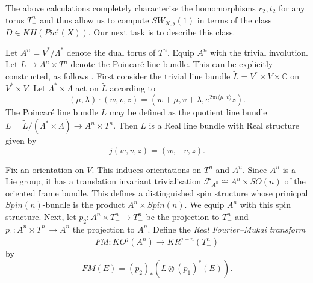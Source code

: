 \documentclass{amsart}
\theoremstyle{definition}
\theoremstyle{remark}
\numberwithin{equation}{section}
\begin{document}
The above calculations completely characterise the homomorphisms $r_2,t_2$ for any torus $T^n_-$ and thus allow us to compute $SW_{X,\mathfrak{s}}(1)$ in terms of the class $D \in KH( Pic^{\mathfrak{s}}(X) )$. Our next task is to describe this class.

Let $A^n = V^*/\Lambda^*$ denote the dual torus of $T^n$. Equip $A^n$ with the trivial involution. Let $L \to A^n \times T^n$ denote the Poincar\'e line bundle. This can be explicitly constructed, as follows \cite{fk}. First consider the trivial line bundle $\widetilde{L} = V^* \times V \times \mathbb{C}$ on $V^* \times V$. Let $\Lambda^* \times \Lambda$ act on $\widetilde{L}$ according to
\[
( \mu , \lambda ) \cdot ( w , v , z ) = (w + \mu , v + \lambda , e^{2\pi i \langle \mu , v \rangle } z).
\]
The Poincar\'e line bundle $L$ may be defined as the quotient line bundle $L = \widetilde{L}/(\Lambda^* \times \Lambda) \to A^n \times T^n$. Then $L$ is a Real line bundle with Real structure given by
\[
j( w , v , z ) = (w , -v , \overline{z}).
\]

Fix an orientation on $V$. This induces orientations on $T^n$ and $A^n$. Since $A^n$ is a Lie group, it has a translation invariant trivialisation $\mathcal{F}_{A^n} \cong A^n \times SO(n)$ of the oriented frame bundle. This defines a distinguished spin structure whose prinicpal $Spin(n)$-bundle is the product $A^n \times Spin(n)$. We equip $A^n$ with this spin structure. Next, let $p_2 : A^n \times T^n_- \to T^n_-$ be the projection to $T^n_-$ and $p_1 : A^n \times T^n_- \to A^n$ the projection to $A^n$. Define the {\em Real Fourier--Mukai transform}
\[
FM : KO^j( A^n ) \to KR^{j-n}( T^n_- )
\]
by
\[
FM( E ) = (p_2)_*( L \otimes (p_1)^*(E) ).
\]
\end{document}
